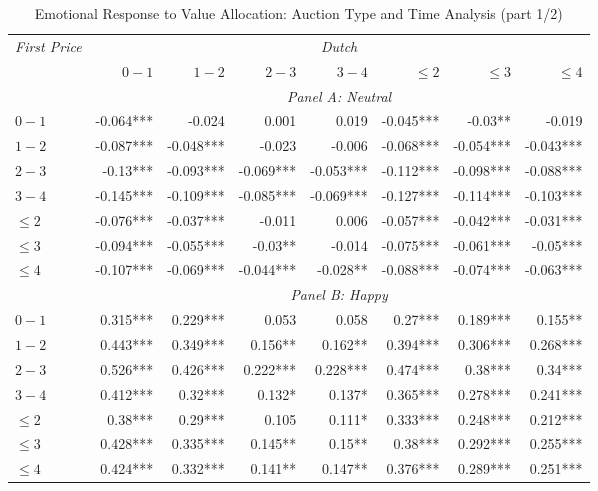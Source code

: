 \documentclass[]{article}
\begin{document}
\begin{table}[!htb] 

\caption{Emotional Response to Value Allocation: Auction Type and Time Analysis (part 1/2)} 

\label{tab:emotionalResponse2} 

\centering 

\begingroup 

\scriptsize 

\begin{tabular}{lrrrrrrr} 

\toprule
\emph{First Price} & \multicolumn{7}{c}{\emph{Dutch}} \\ 

\cmidrule(lr){2-8} 
 & $0-1$ & $1-2$ & $2-3$ & $3-4$ & $\leq 2$ & $\leq 3$ & $\leq 4$ \\ 

\cmidrule(lr){2-8} 

& \multicolumn{7}{c}{\emph{Panel A: Neutral}}\\ 

\cmidrule(lr){1-1} \cmidrule(lr){2-8}
$0-1$ & -0.064*** & -0.024    & 0.001     & 0.019     & -0.045*** & -0.03**   & -0.019    \\ 
  $1-2$ & -0.087*** & -0.048*** & -0.023    & -0.006    & -0.068*** & -0.054*** & -0.043*** \\ 
  $2-3$ & -0.13***  & -0.093*** & -0.069*** & -0.053*** & -0.112*** & -0.098*** & -0.088*** \\ 
  $3-4$ & -0.145*** & -0.109*** & -0.085*** & -0.069*** & -0.127*** & -0.114*** & -0.103*** \\ 
$\leq 2$ & -0.076*** & -0.037*** & -0.011    & 0.006     & -0.057*** & -0.042*** & -0.031*** \\ 
$\leq 3$ & -0.094*** & -0.055*** & -0.03**   & -0.014    & -0.075*** & -0.061*** & -0.05***  \\ 
$\leq 4$ & -0.107*** & -0.069*** & -0.044*** & -0.028**  & -0.088*** & -0.074*** & -0.063*** \\ 
\cmidrule(lr){2-8} 

& \multicolumn{7}{c}{\emph{Panel B: Happy}}\\ 

\cmidrule(lr){1-1} \cmidrule(lr){2-8}
$0-1$ & 0.315***  & 0.229***  & 0.053     & 0.058     & 0.27***   & 0.189***  & 0.155**   \\ 
  $1-2$ & 0.443***  & 0.349***  & 0.156**   & 0.162**   & 0.394***  & 0.306***  & 0.268***  \\ 
  $2-3$ & 0.526***  & 0.426***  & 0.222***  & 0.228***  & 0.474***  & 0.38***   & 0.34***   \\ 
  $3-4$ & 0.412***  & 0.32***   & 0.132*    & 0.137*    & 0.365***  & 0.278***  & 0.241***  \\ 
$\leq 2$ & 0.38***   & 0.29***   & 0.105     & 0.111*    & 0.333***  & 0.248***  & 0.212***  \\ 
$\leq 3$ & 0.428***  & 0.335***  & 0.145**   & 0.15**    & 0.38***   & 0.292***  & 0.255***  \\ 
$\leq 4$ & 0.424***  & 0.332***  & 0.141**   & 0.147**   & 0.376***  & 0.289***  & 0.251***  \\ 
\cmidrule(lr){2-8} 


\end{tabular}
\end{table}
\end{document}
